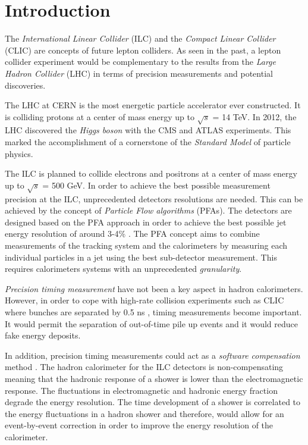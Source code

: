 \chapter{Introduction}

The \textit{International Linear Collider} (ILC) and the \textit{Compact Linear Collider} (CLIC) are concepts of future lepton colliders. As seen in the past, a lepton collider experiment would be complementary to the results from the \textit{Large Hadron Collider} (LHC) in terms of precision measurements and potential discoveries.

The LHC at CERN is the most energetic particle accelerator ever constructed. It is colliding protons at a center of mass energy up to $\sqrt{s}$ = 14 TeV. In 2012, the LHC discovered the \textit{Higgs boson} with the CMS and ATLAS experiments. This marked the accomplishment of a cornerstone of the \textit{Standard Model} of particle physics.

The ILC is planned to collide electrons and positrons at a center of mass energy up to $\sqrt{s}$ = 500 GeV. In order to achieve the best possible measurement precision at the ILC, unprecedented detectors resolutions are needed. This can be achieved by the concept of \textit{Particle Flow algorithms} (PFAs). The detectors are designed based on the PFA approach in order to achieve the best possible jet energy resolution of around 3-4\% \cite{ILC_TDR_Vol1}. The PFA concept aims to combine measurements of the tracking system and the calorimeters by measuring each individual particles in a jet using the best sub-detector measurement. This requires calorimeters systems with an unprecedented \textit{granularity}.

\textit{Precision timing measurement} have not been a key aspect in hadron calorimeters. However, in order to cope with high-rate collision experiments such as CLIC where bunches are separated by 0.5 ns \cite{CLIC_CDR}, timing measurements become important. It would permit the separation of out-of-time pile up events and it would reduce fake energy deposits.

In addition, precision timing measurements could act as a \textit{software compensation} met\-hod \cite{Benaglia2016}. The hadron calorimeter for the ILC detectors is non-compensating meaning that the hadronic res\-ponse of a shower is lower than the electromagnetic response. The fluctuations in electromagnetic and hadronic energy fraction degrade the energy resolution. The time development of a shower is correlated to the energy fluctuations in a hadron shower and therefore, would allow for an event-by-event correction in order to improve the energy resolution of the calorimeter.


